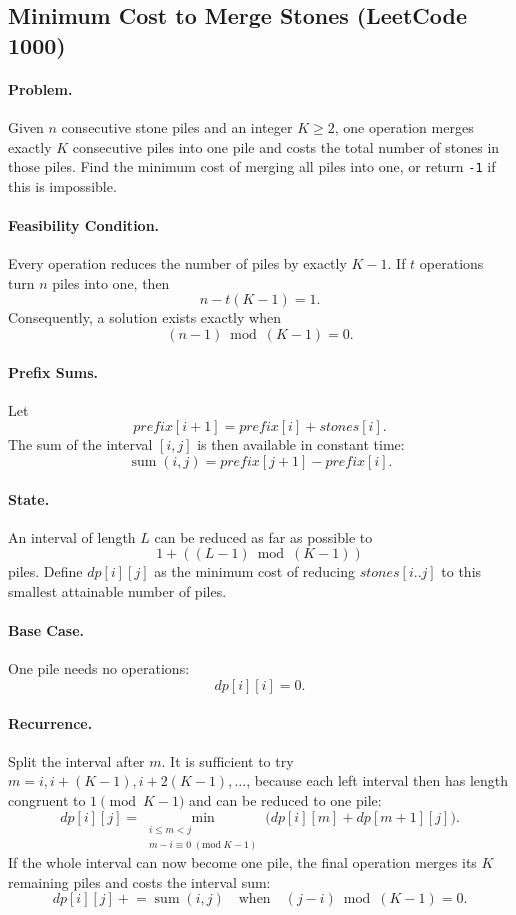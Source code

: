 \documentclass[9pt]{extarticle}
\begin{document}
\subsection{Minimum Cost to Merge Stones (LeetCode 1000)}

\paragraph{Problem.}
Given \(n\) consecutive stone piles and an integer \(K\ge2\), one operation
merges exactly \(K\) consecutive piles into one pile and costs the total number
of stones in those piles. Find the minimum cost of merging all piles into one,
or return \texttt{-1} if this is impossible.

\paragraph{Feasibility Condition.}
Every operation reduces the number of piles by exactly \(K-1\). If \(t\)
operations turn \(n\) piles into one, then
\[
 n-t(K-1)=1.
\]
Consequently, a solution exists exactly when
\[
\boxed{(n-1)\bmod(K-1)=0.}
\]

\paragraph{Prefix Sums.}
Let
\[
\textit{prefix}[i+1]
  = \textit{prefix}[i]+\textit{stones}[i].
\]
The sum of the interval \([i,j]\) is then available in constant time:
\[
\operatorname{sum}(i,j)
  = \textit{prefix}[j+1]-\textit{prefix}[i].
\]

\paragraph{State.}
An interval of length \(L\) can be reduced as far as possible to
\[
1+((L-1)\bmod(K-1))
\]
piles. Define \(dp[i][j]\) as the minimum cost of reducing
\(\textit{stones}[i..j]\) to this smallest attainable number of piles.

\paragraph{Base Case.}
One pile needs no operations:
\[
dp[i][i]=0.
\]

\paragraph{Recurrence.}
Split the interval after \(m\). It is sufficient to try
\(m=i,i+(K-1),i+2(K-1),\ldots\), because each left interval then has length
congruent to \(1\pmod{K-1}\) and can be reduced to one pile:
\[
dp[i][j]
  = \min_{\substack{i\le m<j\\m-i\equiv0\;(\mathrm{mod}\;K-1)}}
      \bigl(dp[i][m]+dp[m+1][j]\bigr).
\]
If the whole interval can now become one pile, the final operation merges its
\(K\) remaining piles and costs the interval sum:
\[
dp[i][j]\mathrel{+}=\operatorname{sum}(i,j)
\quad\text{when}\quad
(j-i)\bmod(K-1)=0.
\]
\end{document}
